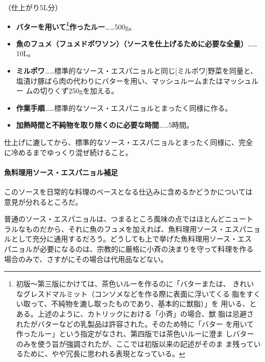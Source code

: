 （仕上がり5L分）

\begin{itemize}
\item
  \textbf{バターを用いて\footnote{初版〜第三版にかけては、茶色いルーを作るのに「バターまたは、
    きれいなグレスドマルミット（コンソメなどを作る際に表面に浮いてくる
    脂をすくい取って、不純物を漉し取ったものであり、基本的に獣脂）」を
    用いる、とある。上述のように、カトリックにおける「小斉」の場合、獣
    脂は忌避されたがバターなどの乳製品は許容された。そのため特に「バター
    を用いて作ったルー」という指定がなされ、第四版では茶色いルーに澄ま
    しバターのみを使う旨が強調されたが、ここでは初版以来の記述がそのま
    ま残っているために、やや冗長に思われる表現となっている。}作ったルー}\ldots{}\ldots{}500g。
\item
  \textbf{魚のフュメ（フュメドポワソン）（ソースを仕上げるために必要な全量）}\ldots{}\ldots{}10L。
\item
  \textbf{ミルポワ}\ldots{}\ldots{}標準的なソース・エスパニョルと同じ{[}ミルポワ{]}野菜を同量と、
  塩漬け豚ばら肉の代わりにバターを用い、マッシュルームまたはマッシュルー
  ムの切りくず250gを加える。
\item
  \textbf{作業手順}\ldots{}\ldots{}標準的なソース・エスパニョルとまったく同様に作る。
\item
  \textbf{加熱時間と不純物を取り除くのに必要な時間}\ldots{}\ldots{}5時間。
\end{itemize}

仕上げに漉してから、標準的なソース・エスパニョルとまったく同様に、完全
に冷めるまでゆっくり混ぜ続けること。

\maeaki

\hypertarget{ux9b5aux6599ux7406ux7528ux30bdux30fcux30b9ux30a8ux30b9ux30d1ux30cbux30e7ux30ebux88dcux8db3}{%
\paragraph{魚料理用ソース・エスパニョル補足}\label{ux9b5aux6599ux7406ux7528ux30bdux30fcux30b9ux30a8ux30b9ux30d1ux30cbux30e7ux30ebux88dcux8db3}}


このソースを日常的な料理のベースとなる仕込みに含めるかどうかについては
意見が分れるところだ。

普通のソース・エスパニョルは、つまるところ風味の点ではほとんどニュート
ラルなものだから、それに魚のフュメを加えれば、魚料理用ソース・エスパニョ
ルとして充分に通用するだろう。どうしても上で挙げた魚料理用ソース・エス
パニョルが必要になるのは、宗教的に厳格に小斉の決まりを守って料理を作る
場合のみで、さすがにその場合は代用品などない。

